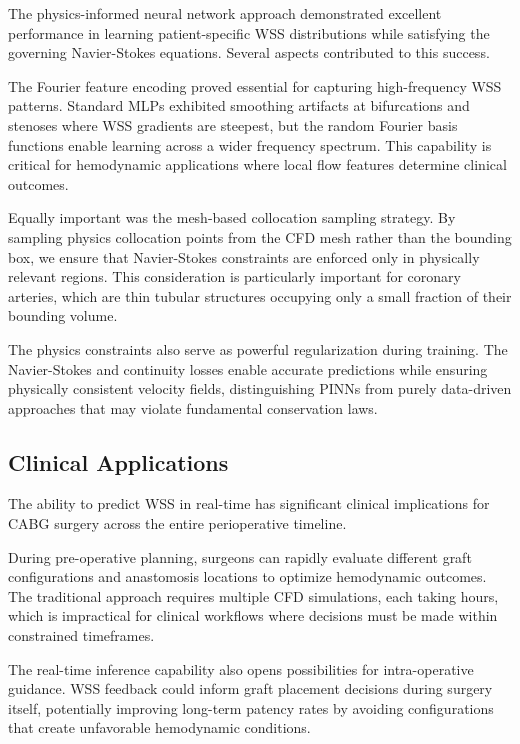 \documentclass[12pt,a4paper]{article}
\begin{document}
The physics-informed neural network approach demonstrated excellent performance in learning patient-specific WSS distributions while satisfying the governing Navier-Stokes equations. Several aspects contributed to this success.

The Fourier feature encoding proved essential for capturing high-frequency WSS patterns. Standard MLPs exhibited smoothing artifacts at bifurcations and stenoses where WSS gradients are steepest, but the random Fourier basis functions enable learning across a wider frequency spectrum. This capability is critical for hemodynamic applications where local flow features determine clinical outcomes.

Equally important was the mesh-based collocation sampling strategy. By sampling physics collocation points from the CFD mesh rather than the bounding box, we ensure that Navier-Stokes constraints are enforced only in physically relevant regions. This consideration is particularly important for coronary arteries, which are thin tubular structures occupying only a small fraction of their bounding volume.

The physics constraints also serve as powerful regularization during training. The Navier-Stokes and continuity losses enable accurate predictions while ensuring physically consistent velocity fields, distinguishing PINNs from purely data-driven approaches that may violate fundamental conservation laws.

\subsection{Clinical Applications}

The ability to predict WSS in real-time has significant clinical implications for CABG surgery across the entire perioperative timeline.

During pre-operative planning, surgeons can rapidly evaluate different graft configurations and anastomosis locations to optimize hemodynamic outcomes. The traditional approach requires multiple CFD simulations, each taking hours, which is impractical for clinical workflows where decisions must be made within constrained timeframes.

The real-time inference capability also opens possibilities for intra-operative guidance. WSS feedback could inform graft placement decisions during surgery itself, potentially improving long-term patency rates by avoiding configurations that create unfavorable hemodynamic conditions.
\end{document}
